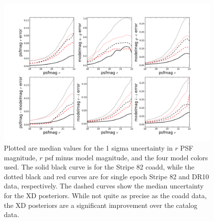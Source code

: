 \documentclass[12pt,preprint]{aastex}
\begin{document}
\begin{figure}
\centering
\includegraphics[clip=true, trim=1.5cm 0.5cm 1.5cm 0.5cm,
  width=16cm]{fig3.png}
\caption{Plotted are median values for the 1 sigma uncertainty in $r$ PSF
magnitude, $r$
psf minus model magnitude, and the four model colors used.  The solid black 
curve is for the Stripe 82 coadd, while the dotted black and red curves are for
single epoch Stripe 82 and DR10 data, respectively.  The dashed curves show the
median uncertainty for the XD posteriors.  While not quite as precise as the 
coadd data, the XD posteriors are a significant improvement over the catalog
data.
}
\label{fig:error_rates}
\end{figure}
\end{document}
